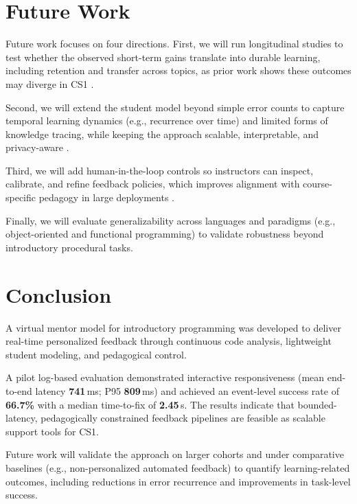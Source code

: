\documentclass[conference]{IEEEtran}
\begin{document}
\section{Future Work}

Future work focuses on four directions. First, we will run longitudinal studies to test whether the observed short-term gains translate into durable learning, including retention and transfer across topics, as prior work shows these outcomes may diverge in CS1 \cite{FeasibilityStudyofAugmentingTeachingAssistantswithAI,NavigatingAutomatedFeedback}.

Second, we will extend the student model beyond simple error counts to capture temporal learning dynamics (e.g., recurrence over time) and limited forms of knowledge tracing, while keeping the approach scalable, interpretable, and privacy-aware \cite{AIEnabledIntelligentAssistant}.

Third, we will add human-in-the-loop controls so instructors can inspect, calibrate, and refine feedback policies, which improves alignment with course-specific pedagogy in large deployments \cite{ImprovingAIinCS50,CodeAid}.

Finally, we will evaluate generalizability across languages and paradigms (e.g., object-oriented and functional programming) to validate robustness beyond introductory procedural tasks.


\section{Conclusion}

A virtual mentor model for introductory programming was developed to deliver real-time personalized feedback through continuous code analysis, lightweight student modeling, and pedagogical control.

A pilot log-based evaluation demonstrated interactive responsiveness (mean end-to-end latency \textbf{741}\,ms; P95 \textbf{809}\,ms) and achieved an event-level success rate of \textbf{66.7\%} with a median time-to-fix of \textbf{2.45}\,s. The results indicate that bounded-latency, pedagogically constrained feedback pipelines are feasible as scalable support tools for CS1.

Future work will validate the approach on larger cohorts and under comparative baselines (e.g., non-personalized automated feedback) to quantify learning-related outcomes, including reductions in error recurrence and improvements in task-level success.
\end{document}
